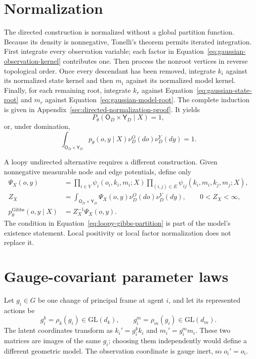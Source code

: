 \section{Normalization}

The directed construction is normalized without a global partition function. Because its density is nonnegative, Tonelli's theorem permits iterated integration. First integrate every observation variable; each factor in Equation~\eqref{eq:gaussian-observation-kernel} contributes one. Then process the nonroot vertices in reverse topological order. Once every descendant has been removed, integrate \(k_i\) against its normalized state kernel and then \(m_i\) against its normalized model kernel. Finally, for each remaining root, integrate \(k_r\) against Equation~\eqref{eq:gaussian-state-root} and \(m_r\) against Equation~\eqref{eq:gaussian-model-root}. The complete induction is given in Appendix~\ref{sec:directed-normalization-proof}. It yields
\begin{equation}
P_\theta(\mathsf O_D\times\mathsf Y_D\mid X)=1,
\label{eq:kernel-total-mass-one}
\end{equation}
or, under domination,
\begin{equation}
\int_{\mathsf O_D\times\mathsf Y_D}
p_\theta(o,y\mid X)\nu_D^O(do)\nu_D^Y(dy)=1.
\label{eq:density-normalization}
\end{equation}

A loopy undirected alternative requires a different construction. Given nonnegative measurable node and edge potentials, define only
\begin{align}
\Psi_X(o,y)
&=\prod_{i\in V}\psi_i(o_i,k_i,m_i;X)
\prod_{(i,j)\in E}\psi_{ij}(k_i,m_i,k_j,m_j;X),
\label{eq:loopy-gibbs-potential}\\
Z_X
&=\int_{\mathsf O_D\times\mathsf Y_D}
\Psi_X(o,y)\nu_D^O(do)\nu_D^Y(dy),
\qquad 0<Z_X<\infty,
\label{eq:loopy-gibbs-partition}\\
p_\theta^{\mathrm{Gibbs}}(o,y\mid X)
&=Z_X^{-1}\Psi_X(o,y).
\label{eq:loopy-gibbs-density}
\end{align}
The condition in Equation~\eqref{eq:loopy-gibbs-partition} is part of the model's existence statement. Local positivity or local factor normalization does not replace it.

\section{Gauge-covariant parameter laws}

Let \(g_i\in G\) be one change of principal frame at agent \(i\), and let its represented actions be
\begin{equation}
g_i^k=\rho_k(g_i)\in\mathrm{GL}(d_k),
\qquad
g_i^m=\rho_m(g_i)\in\mathrm{GL}(d_m).
\label{eq:generative-represented-gauge-actions}
\end{equation}
The latent coordinates transform as \(k_i'=g_i^k k_i\) and \(m_i'=g_i^m m_i\). These two matrices are images of the same \(g_i\); choosing them independently would define a different geometric model. The observation coordinate is gauge inert, so \(o_i'=o_i\).

